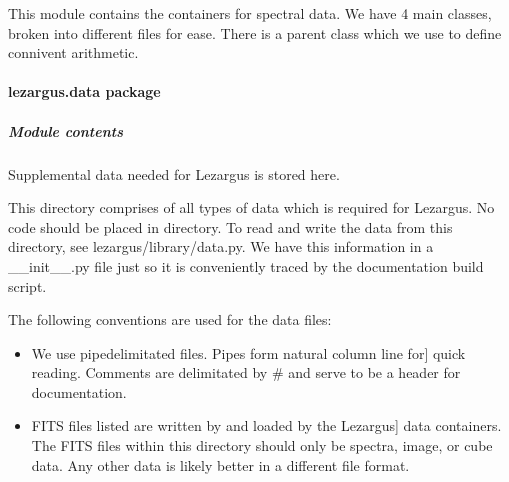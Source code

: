 \documentclass[letterpaper,11pt,english]{sphinxmanual}
\begin{document}
\sphinxAtStartPar
This module contains the containers for spectral data. We have 4 main classes,
broken into different files for ease. There is a parent class which we use
to define connivent arithmetic.

\sphinxstepscope


\paragraph{lezargus.data package}
\label{\detokenize{code/lezargus.data:lezargus-data-package}}\label{\detokenize{code/lezargus.data::doc}}

\subparagraph{Module contents}
\label{\detokenize{code/lezargus.data:module-lezargus.data}}\label{\detokenize{code/lezargus.data:module-contents}}
\sphinxAtStartPar
Supplemental data needed for Lezargus is stored here.

\sphinxAtStartPar
This directory comprises of all types of data which is required for Lezargus.
No code should be placed in directory. To read and write the data from this
directory, see lezargus/library/data.py. We have this information in a
\_\_init\_\_.py file just so it is conveniently traced by the documentation build
script.

\sphinxAtStartPar
The following conventions are used for the data files:
\begin{itemize}
\item {} \begin{description}
\sphinxlineitem{CSV files}{[}We use pipe\sphinxhyphen{}delimitated files. Pipes form natural column line for{]}
\sphinxAtStartPar
quick reading. Comments are delimitated by \# and serve to be a
header for documentation.

\end{description}

\item {} \begin{description}
\sphinxlineitem{FITS files}{[}FITS files listed are written by and loaded by the Lezargus{]}
\sphinxAtStartPar
data containers. The FITS files within this directory should
only be spectra, image, or cube data. Any other data is likely
better in a different file format.

\end{description}

\end{itemize}
\end{document}
